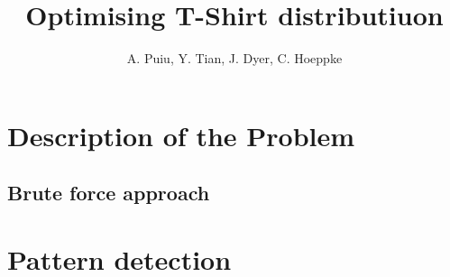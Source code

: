 \documentclass{beamer}
\title[T-Shirt Problem]{Optimising T-Shirt distributiuon} %
\author{A. Puiu, Y. Tian, J. Dyer, C. Hoeppke} %
\institute[University of Oxford] %
{
University of Oxford\\
Department for Mathematics
\date{\today} %
}
\begin{document}
\begin{frame}
\titlepage %
\end{frame}

\section{Description of the Problem}

\subsection{Brute force approach}



\section{Pattern detection}


\end{document}
